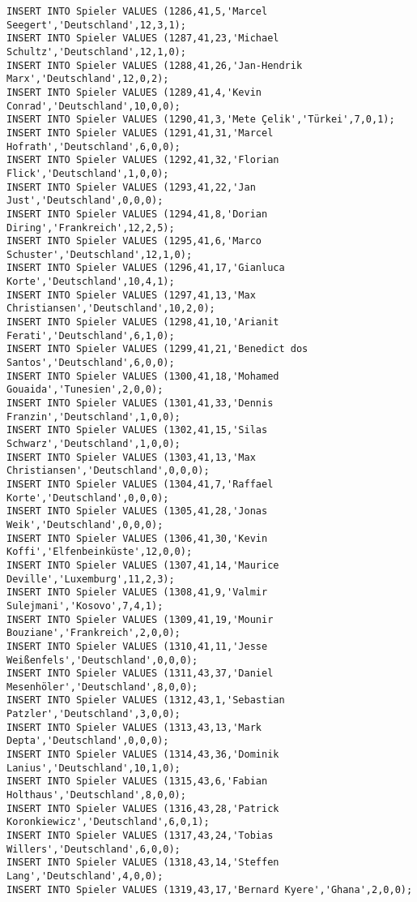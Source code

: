 \documentclass{bschlangaul-aufgabe}
\begin{document}
\begin{verbatim}
INSERT INTO Spieler VALUES (1286,41,5,'Marcel Seegert','Deutschland',12,3,1);
INSERT INTO Spieler VALUES (1287,41,23,'Michael Schultz','Deutschland',12,1,0);
INSERT INTO Spieler VALUES (1288,41,26,'Jan-Hendrik Marx','Deutschland',12,0,2);
INSERT INTO Spieler VALUES (1289,41,4,'Kevin Conrad','Deutschland',10,0,0);
INSERT INTO Spieler VALUES (1290,41,3,'Mete Çelik','Türkei',7,0,1);
INSERT INTO Spieler VALUES (1291,41,31,'Marcel Hofrath','Deutschland',6,0,0);
INSERT INTO Spieler VALUES (1292,41,32,'Florian Flick','Deutschland',1,0,0);
INSERT INTO Spieler VALUES (1293,41,22,'Jan Just','Deutschland',0,0,0);
INSERT INTO Spieler VALUES (1294,41,8,'Dorian Diring','Frankreich',12,2,5);
INSERT INTO Spieler VALUES (1295,41,6,'Marco Schuster','Deutschland',12,1,0);
INSERT INTO Spieler VALUES (1296,41,17,'Gianluca Korte','Deutschland',10,4,1);
INSERT INTO Spieler VALUES (1297,41,13,'Max Christiansen','Deutschland',10,2,0);
INSERT INTO Spieler VALUES (1298,41,10,'Arianit Ferati','Deutschland',6,1,0);
INSERT INTO Spieler VALUES (1299,41,21,'Benedict dos Santos','Deutschland',6,0,0);
INSERT INTO Spieler VALUES (1300,41,18,'Mohamed Gouaida','Tunesien',2,0,0);
INSERT INTO Spieler VALUES (1301,41,33,'Dennis Franzin','Deutschland',1,0,0);
INSERT INTO Spieler VALUES (1302,41,15,'Silas Schwarz','Deutschland',1,0,0);
INSERT INTO Spieler VALUES (1303,41,13,'Max Christiansen','Deutschland',0,0,0);
INSERT INTO Spieler VALUES (1304,41,7,'Raffael Korte','Deutschland',0,0,0);
INSERT INTO Spieler VALUES (1305,41,28,'Jonas Weik','Deutschland',0,0,0);
INSERT INTO Spieler VALUES (1306,41,30,'Kevin Koffi','Elfenbeinküste',12,0,0);
INSERT INTO Spieler VALUES (1307,41,14,'Maurice Deville','Luxemburg',11,2,3);
INSERT INTO Spieler VALUES (1308,41,9,'Valmir Sulejmani','Kosovo',7,4,1);
INSERT INTO Spieler VALUES (1309,41,19,'Mounir Bouziane','Frankreich',2,0,0);
INSERT INTO Spieler VALUES (1310,41,11,'Jesse Weißenfels','Deutschland',0,0,0);
INSERT INTO Spieler VALUES (1311,43,37,'Daniel Mesenhöler','Deutschland',8,0,0);
INSERT INTO Spieler VALUES (1312,43,1,'Sebastian Patzler','Deutschland',3,0,0);
INSERT INTO Spieler VALUES (1313,43,13,'Mark Depta','Deutschland',0,0,0);
INSERT INTO Spieler VALUES (1314,43,36,'Dominik Lanius','Deutschland',10,1,0);
INSERT INTO Spieler VALUES (1315,43,6,'Fabian Holthaus','Deutschland',8,0,0);
INSERT INTO Spieler VALUES (1316,43,28,'Patrick Koronkiewicz','Deutschland',6,0,1);
INSERT INTO Spieler VALUES (1317,43,24,'Tobias Willers','Deutschland',6,0,0);
INSERT INTO Spieler VALUES (1318,43,14,'Steffen Lang','Deutschland',4,0,0);
INSERT INTO Spieler VALUES (1319,43,17,'Bernard Kyere','Ghana',2,0,0);

\end{verbatim}
\end{document}
